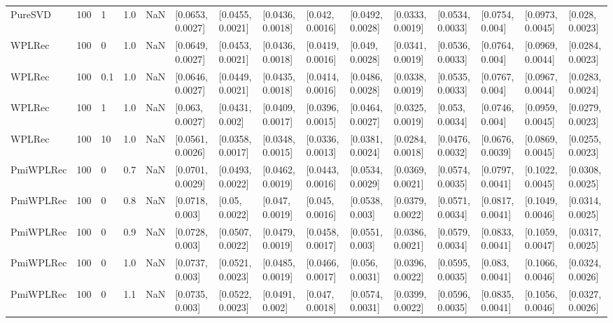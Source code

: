 \begin{tabular}{lllrrllllllllll}
   PureSVD &  100 &     1 &   1.0 &   NaN &  [0.0653, 0.0027] &  [0.0455, 0.0021] &  [0.0436, 0.0018] &   [0.042, 0.0016] &  [0.0492, 0.0028] &  [0.0333, 0.0019] &  [0.0534, 0.0033] &   [0.0754, 0.004] &  [0.0973, 0.0045] &   [0.028, 0.0023] \\
    WPLRec &  100 &     0 &   1.0 &   NaN &  [0.0649, 0.0027] &  [0.0453, 0.0021] &  [0.0436, 0.0018] &  [0.0419, 0.0016] &   [0.049, 0.0028] &  [0.0341, 0.0019] &  [0.0536, 0.0033] &   [0.0764, 0.004] &  [0.0969, 0.0044] &  [0.0284, 0.0023] \\
    WPLRec &  100 &   0.1 &   1.0 &   NaN &  [0.0646, 0.0027] &  [0.0449, 0.0021] &  [0.0435, 0.0018] &  [0.0414, 0.0016] &  [0.0486, 0.0028] &  [0.0338, 0.0019] &  [0.0535, 0.0033] &   [0.0767, 0.004] &  [0.0967, 0.0044] &  [0.0283, 0.0024] \\
    WPLRec &  100 &     1 &   1.0 &   NaN &   [0.063, 0.0027] &   [0.0431, 0.002] &  [0.0409, 0.0017] &  [0.0396, 0.0015] &  [0.0464, 0.0027] &  [0.0325, 0.0019] &   [0.053, 0.0034] &   [0.0746, 0.004] &  [0.0959, 0.0045] &  [0.0279, 0.0023] \\
    WPLRec &  100 &    10 &   1.0 &   NaN &  [0.0561, 0.0026] &  [0.0358, 0.0017] &  [0.0348, 0.0015] &  [0.0336, 0.0013] &  [0.0381, 0.0024] &  [0.0284, 0.0018] &  [0.0476, 0.0032] &  [0.0676, 0.0039] &  [0.0869, 0.0045] &  [0.0255, 0.0023] \\
 PmiWPLRec &  100 &     0 &   0.7 &   NaN &  [0.0701, 0.0029] &  [0.0493, 0.0022] &  [0.0462, 0.0019] &  [0.0443, 0.0016] &  [0.0534, 0.0029] &  [0.0369, 0.0021] &  [0.0574, 0.0035] &  [0.0797, 0.0041] &  [0.1022, 0.0045] &  [0.0308, 0.0025] \\
 PmiWPLRec &  100 &     0 &   0.8 &   NaN &   [0.0718, 0.003] &    [0.05, 0.0022] &   [0.047, 0.0019] &   [0.045, 0.0016] &   [0.0538, 0.003] &  [0.0379, 0.0022] &  [0.0571, 0.0034] &  [0.0817, 0.0041] &  [0.1049, 0.0046] &  [0.0314, 0.0025] \\
 PmiWPLRec &  100 &     0 &   0.9 &   NaN &   [0.0728, 0.003] &  [0.0507, 0.0022] &  [0.0479, 0.0019] &  [0.0458, 0.0017] &   [0.0551, 0.003] &  [0.0386, 0.0021] &  [0.0579, 0.0034] &  [0.0833, 0.0041] &  [0.1059, 0.0047] &  [0.0317, 0.0025] \\
 PmiWPLRec &  100 &     0 &   1.0 &   NaN &   [0.0737, 0.003] &  [0.0521, 0.0023] &  [0.0485, 0.0019] &  [0.0466, 0.0017] &   [0.056, 0.0031] &  [0.0396, 0.0022] &  [0.0595, 0.0035] &   [0.083, 0.0041] &  [0.1066, 0.0046] &  [0.0324, 0.0026] \\
 PmiWPLRec &  100 &     0 &   1.1 &   NaN &   [0.0735, 0.003] &  [0.0522, 0.0023] &   [0.0491, 0.002] &   [0.047, 0.0018] &  [0.0574, 0.0031] &  [0.0399, 0.0022] &  [0.0596, 0.0035] &  [0.0835, 0.0041] &  [0.1056, 0.0046] &  [0.0327, 0.0026] \\

\end{tabular}
